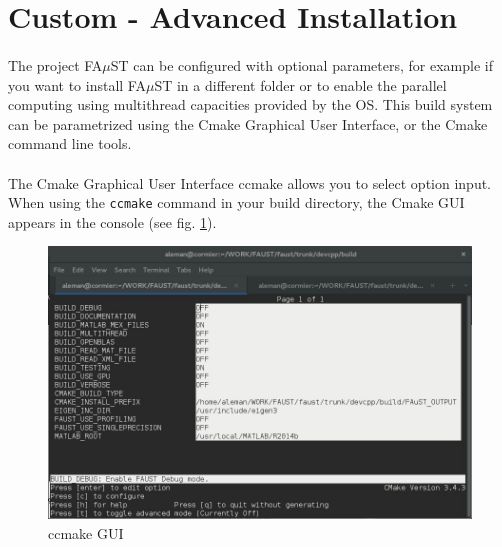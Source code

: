 \section{Custom - Advanced Installation}\label{sec:UnixCustomInstall}

\paragraph{}The project FA$\mu$ST can be configured with optional parameters, for example if you want to install FA$\mu$ST in a different folder or to enable the parallel computing using multithread capacities provided by the OS. This build system can be parametrized using the Cmake Graphical User Interface, or the Cmake command line tools. 

\paragraph{}The Cmake Graphical User Interface ccmake allows you to select option input. When using the \texttt{ccmake} command in your build directory, the Cmake GUI appears in the console (see fig. \ref{fig:ccmake}).

\begin{figure}[!h] %
\centering
\includegraphics[scale=0.5]{images/ccmake.jpg}
\caption{ccmake GUI}
\label{fig:ccmake}
\end{figure}


